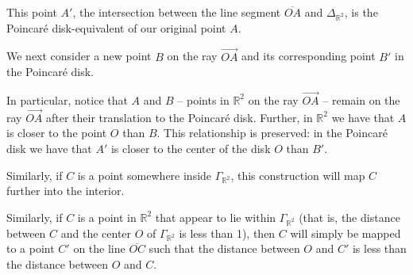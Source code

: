 \documentclass[12pt]{article}
\newcommand{\R}{\mathbb{R}}
\newcommand{\poincare}{Poincar\'{e} }
\theoremstyle{plain}
\theoremstyle{definition}
\begin{document}
\begin{appendices}
\begin{center}
\end{center}

This point $A'$, the intersection between the line segment $\overline{OA}$ and $\Delta_{\R^2}$, is the \poincare disk-equivalent of our original point $A$.

We next consider a new point $B$ on the ray $\overrightarrow{OA}$ and its corresponding point $B'$ in the \poincare disk. 

\begin{center}
\end{center}

In particular, notice that $A$ and $B$ -- points in $\R^2$ on the ray $\overrightarrow{OA}$ -- remain on the ray $\overrightarrow{OA}$ after their translation to the \poincare disk. Further, in $\R^2$ we have that $A$ is closer to the point $O$ than $B$. This relationship is preserved: in the \poincare disk we have that $A'$ is closer to the center of the disk $O$ than $B'$. 


Similarly, if $C$ is a point somewhere inside $\Gamma_{\R^2}$, this construction will map $C$ further into the interior.

Similarly, if $C$ is a point in $\R^2$ that appear to lie within $\Gamma_{\R^2}$ (that is, the distance between $C$ and the center $O$ of $\Gamma_{\R^2}$ is less than 1), then $C$ will simply be mapped to a point $C'$ on the line $\overline{OC}$ such that the distance between $O$ and $C'$ is less than the distance between $O$ and $C$. 


\end{appendices}
\end{document}
